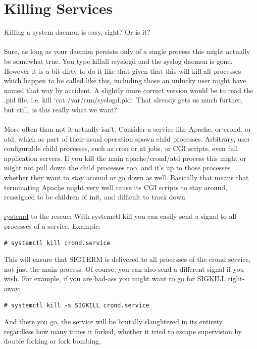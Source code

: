 \documentclass[titlepage]{article}
\begin{document}
\section{Killing Services}
Killing a system daemon is easy, right? Or is it?
\\
\\
Sure, as long as your daemon persists only of a single process this might actually be somewhat true. You type killall rsyslogd and the syslog daemon is gone. However it is a bit dirty to do it like that given that this will kill all processes which happen to be called like this, including those an unlucky user might have named that way by accident. A slightly more correct version would be to read the .pid file, i.e. kill `cat /var/run/syslogd.pid`. That already gets us much further, but still, is this really what we want?
\\
\\
More often than not it actually isn't. Consider a service like Apache, or crond, or atd, which as part of their usual operation spawn child processes. Arbitrary, user configurable child processes, such as cron or at jobs, or CGI scripts, even full application servers. If you kill the main apache/crond/atd process this might or might not pull down the child processes too, and it's up to those processes whether they want to stay around or go down as well. Basically that means that terminating Apache might very well cause its CGI scripts to stay around, reassigned to be children of init, and difficult to track down.
\\
\\
\href{https://www.freedesktop.org/wiki/Software/systemd}{systemd} to the rescue: With systemctl kill you can easily send a signal to all processes of a service. Example:
\begin{lstlisting}
# systemctl kill crond.service
\end{lstlisting}
This will ensure that SIGTERM is delivered to all processes of the crond service, not just the main process. Of course, you can also send a different signal if you wish. For example, if you are bad-ass you might want to go for SIGKILL right-away:
\begin{lstlisting}
# systemctl kill -s SIGKILL crond.service
\end{lstlisting}
And there you go, the service will be brutally slaughtered in its entirety, regardless how many times it forked, whether it tried to escape supervision by double forking or fork bombing.
\\
\\
\end{document}

